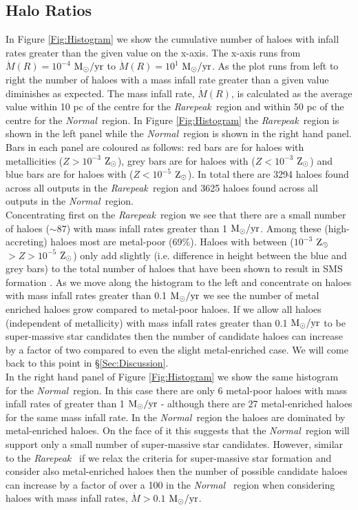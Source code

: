 \documentclass[graphics, twocolumn, usenatbib]{mn2e}
\newcommand{\msolaryr} {$\rm{M_{\odot}/yr}~$}
\newcommand{\msolaryrc} {$\rm{M_{\odot}/yr}$}
\newcommand{\zsolar} {$\rm{Z_{\odot}}~$}
\newcommand{\zsolarc} {$\rm{Z_{\odot}}$}
\newcommand{\rarepeak} {\textit{Rarepeak~}}
\newcommand{\normal} {\textit{Normal~}}
\begin{document}
\subsection{Halo Ratios}
In Figure \ref{Fig:Histogram} we show the cumulative number of haloes with infall rates greater than
the given value on the x-axis. The x-axis runs from $\dot{M}(R) = 10^{-4}$ \msolaryr to 
$\dot{M}(R) = 10^{1}$ \msolaryrc. As the plot runs from left to right the number of haloes with a
mass infall rate greater than a given value diminishes as expected. The mass infall rate,
$\dot{M}(R)$, is calculated as the average value within 10 pc of the centre for the \rarepeak region
and within 50 pc of the centre for the \normal region. In Figure  \ref{Fig:Histogram} the
\rarepeak region is shown in the left panel while the \normal region is shown in the right hand
panel. Bars in each panel are coloured as follows: red bars are for haloes with metallicities
($Z > 10^{-3}$ \zsolarc), grey bars are for haloes with ($Z < 10^{-3}$ \zsolarc) and blue bars are for
haloes with ($Z < 10^{-5}$ \zsolarc). In total there are 3294 haloes found across all outputs in
the \rarepeak region and 3625 haloes found across all outputs in the \normal region. \\
\indent Concentrating first on the \rarepeak region we see that there are a small number of
haloes ($\sim 87$) with mass infall rates greater than 1 \msolaryrc. Among these (high-accreting)
haloes most are metal-poor (69\%). Haloes with between
($10^{-3}$ \zsolar $> Z > 10^{-5}$ \zsolarc) only add slightly (i.e. difference in height between the
blue and grey bars) to the total number of haloes that
have been shown to result in SMS formation \citep{Chon_2020}. As we move along the histogram to the
left and concentrate on haloes with mass infall rates greater than 0.1 \msolaryr we see the
number of metal enriched haloes grow compared to
metal-poor haloes. If we allow all haloes (independent of metallicity) with mass infall rates greater
than  0.1 \msolaryr to be super-massive star candidates then the number of candidate haloes can
increase by a factor of two compared to even the slight metal-enriched case. We will
come back to this point in \S \ref{Sec:Discussion}. \\
\indent In the right hand panel of Figure \ref{Fig:Histogram}
we show the same histogram for the \normal region. In this case there are only 6 metal-poor haloes
with mass infall rates of greater than 1 \msolaryr - although there are 27 
metal-enriched haloes for the same mass infall rate. In the
\normal region the haloes are dominated by metal-enriched haloes.
On the face of it this suggests that the \normal region will
support only a small number of super-massive star candidates. However, similar to the \rarepeak
if we relax the criteria for super-massive star formation and consider also metal-enriched haloes
then the number of possible candidate haloes can increase by a factor of over a 100 in the \normal
region when considering haloes with mass infall rates, $\dot{M} > 0.1 $ \msolaryrc. 
\end{document}
